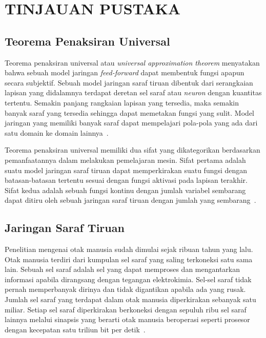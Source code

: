 

\chapter{TINJAUAN PUSTAKA}
\label{cha:2-TinjauanPustaka}

\section{Teorema Penaksiran Universal \label{sec:2-TeoremaPenaksiranUniversal}}
Teorema penaksiran universal atau \textit{universal approximation theorem} menyatakan bahwa sebuah
model jaringan \textit{feed-forward} dapat membentuk fungsi apapun secara subjektif. Sebuah model
jaringan saraf tiruan dibentuk dari serangkaian lapisan yang didalamnya terdapat deretan sel saraf
atau \textit{neuron} dengan kuantitas tertentu. Semakin panjang rangkaian lapisan yang tersedia,
maka semakin banyak saraf yang tersedia sehingga dapat memetakan fungsi yang sulit.
Model jaringan yang memiliki banyak saraf dapat mempelajari pola-pola yang ada dari satu
domain ke domain lainnya~\cite{2016arXiv160100013G}.

Teorema penaksiran universal memiliki dua sifat yang dikategorikan berdasarkan pemanfaatannya dalam
melakukan pemelajaran mesin. Sifat pertama adalah suatu model jaringan saraf tiruan dapat
memperkirakan suatu fungsi dengan batasan-batasan tertentu sesuai dengan fungsi aktivasi pada
lapisan terakhir. Sifat kedua adalah sebuah fungsi kontinu dengan jumlah variabel sembarang dapat
ditiru oleh sebuah jaringan saraf tiruan dengan jumlah yang sembarang~\cite{2019arXiv191003344K}.

\section{Jaringan Saraf Tiruan \label{sec:2-JaringanSarafTiruan}}
Penelitian mengenai otak manusia sudah dimulai sejak ribuan tahun yang lalu.
Otak manusia terdiri dari kumpulan sel saraf yang saling terkoneksi satu sama lain. Sebuah sel saraf
adalah sel yang dapat memproses dan mengantarkan informasi apabila dirangsang dengan tegangan
elektrokimia. Sel-sel saraf tidak pernah memperbanyak dirinya dan tidak digantikan apabila ada yang
rusak. Jumlah sel saraf yang terdapat dalam otak manusia diperkirakan sebanyak satu miliar. Setiap
sel saraf diperkirakan berkoneksi dengan sepuluh ribu sel saraf lainnya melalui sinapsis yang
berarti otak manusia beroperasi seperti prosesor dengan kecepatan satu triliun bit per
detik~\cite{10.3389/neuro.09.031.2009}.

